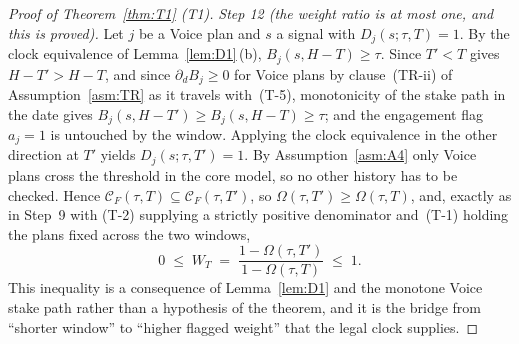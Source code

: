 \documentclass[11pt]{article}
\begin{document}
\begin{proof}[Proof of Theorem~\ref{thm:T1} (T1)]
\emph{Step 12 (the weight ratio is at most one, and this is proved).} Let $j$ be a Voice plan and
$s$ a signal with $D_j(s;\tau,T) = 1$. By the clock equivalence of Lemma~\ref{lem:D1}\,(b),
$B_j(s,H-T) \ge \tau$. Since $T' < T$ gives $H-T' > H-T$, and since $\partial_d B_j \ge 0$ for Voice
plans by clause~(TR-ii) of Assumption~\ref{asm:TR} as it travels with~(T-5), monotonicity of the
stake path in the date gives $B_j(s,H-T') \ge B_j(s,H-T) \ge \tau$; and the engagement flag $a_j=1$
is untouched by the window. Applying the clock equivalence in the other direction at $T'$ yields
$D_j(s;\tau,T') = 1$. By Assumption~\ref{asm:A4} only Voice plans cross the threshold in the core
model, so no other history has to be checked. Hence $\mathcal C_F(\tau,T) \subseteq
\mathcal C_F(\tau,T')$, so $\Omega(\tau,T') \ge \Omega(\tau,T)$, and, exactly as in Step~9 with
\mbox{(T-2)} supplying a strictly positive denominator and~(T-1) holding the plans fixed across the
two windows,
\[
0 \;\le\; W_T \;=\; \frac{1-\Omega(\tau,T')}{1-\Omega(\tau,T)} \;\le\; 1 .
\]
This inequality is a consequence of Lemma~\ref{lem:D1} and the monotone Voice stake path rather
than a hypothesis of the theorem, and it is the bridge from ``shorter window'' to ``higher flagged
weight'' that the legal clock supplies.


\end{proof}
\end{document}
